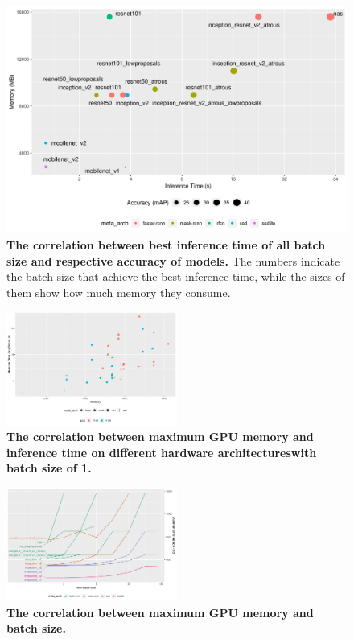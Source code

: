 \documentclass[conference]{IEEEtran}
\begin{document}
\begin{figure}[htpb]
	  \centering
	  \includegraphics[width=\textwidth]{TimeVSAccuracy}
	  \caption{\textbf{The correlation between best inference time of all batch size and respective accuracy of models.} The numbers indicate the batch size that achieve the best inference time, while the sizes of them show how much memory they consume.}
	  \label{fig:time-accuracy}
\end{figure}

\begin{figure}[htpb]
	  \centering
	  \includegraphics[width=0.5\textwidth]{MemoryVSRunning-DiffArch-Batch1}
	  \caption{\textbf{The correlation between maximum GPU memory and inference time on different hardware architectureswith batch size of 1.}
          }
	  \label{fig:memory-running-diff-arch}
\end{figure}

\begin{figure}[htpb]
	  \centering
	  \includegraphics[width=0.5\textwidth]{MemoryVSBatch}
	  \caption{\textbf{The correlation between maximum GPU memory and batch size.} }
	  \label{fig:memory-batch}
\end{figure}
\end{document}
